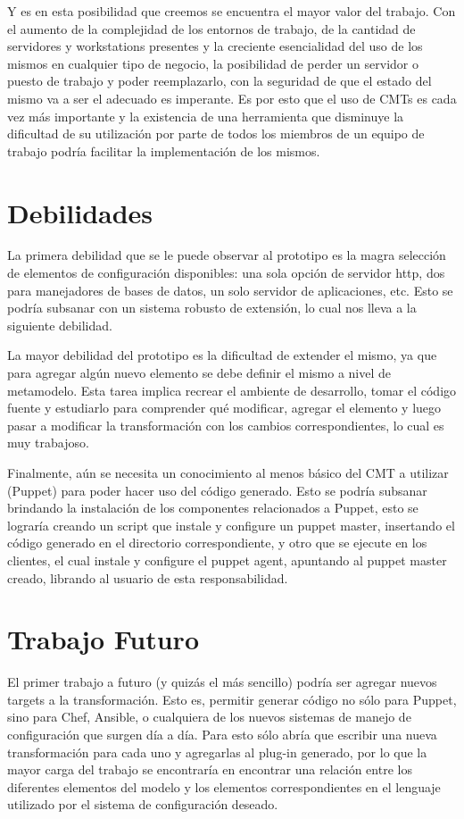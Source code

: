 Y es en esta posibilidad que creemos se encuentra el mayor valor del trabajo. Con el aumento de la complejidad de los entornos de trabajo, de la cantidad de servidores y workstations presentes y la creciente esencialidad del uso de los mismos en cualquier tipo de negocio, la posibilidad de perder un servidor o puesto de trabajo y poder reemplazarlo, con la seguridad de que el estado del mismo va a ser el adecuado es imperante. Es por esto que el uso de CMTs es cada vez más importante y la existencia de una herramienta que disminuye la dificultad de su utilización por parte de todos los miembros de un equipo de trabajo podría facilitar la implementación de los mismos.

\section{Debilidades}
La primera debilidad que se le puede observar al prototipo es la magra selección de elementos de configuración disponibles: una sola opción de servidor http, dos para manejadores de bases de datos, un solo servidor de aplicaciones, etc. Esto se podría subsanar con un sistema robusto de extensión, lo cual nos lleva a la siguiente debilidad.

La mayor debilidad del prototipo es la dificultad de extender el mismo, ya que para agregar algún nuevo elemento se debe definir el mismo a nivel de metamodelo. Esta tarea implica recrear el ambiente de desarrollo, tomar el código fuente y estudiarlo para comprender qué modificar, agregar el elemento y luego pasar a modificar la transformación con los cambios correspondientes, lo cual es muy trabajoso.

Finalmente, aún se necesita un conocimiento al menos básico del CMT a utilizar (Puppet) para poder hacer uso del código generado. Esto se podría subsanar brindando la instalación de los componentes relacionados a Puppet, esto se lograría creando un script que instale y configure un puppet master, insertando el código generado en el directorio correspondiente, y otro que se ejecute en los clientes, el cual instale y configure el puppet agent, apuntando al puppet master creado, librando al usuario de esta responsabilidad.

\section{Trabajo Futuro} \label{Trabajo a futuro}
El primer trabajo a futuro (y quizás el más sencillo) podría ser agregar nuevos targets a la transformación. Esto es, permitir generar código no sólo para Puppet, sino para Chef, Ansible, o cualquiera de los nuevos sistemas de manejo de configuración que surgen día a día. Para esto sólo abría que escribir una nueva transformación para cada uno y agregarlas al plug-in generado, por lo que la mayor carga del trabajo se encontraría en encontrar una relación entre los diferentes elementos del modelo y los elementos correspondientes en el lenguaje utilizado por el sistema de configuración deseado.

